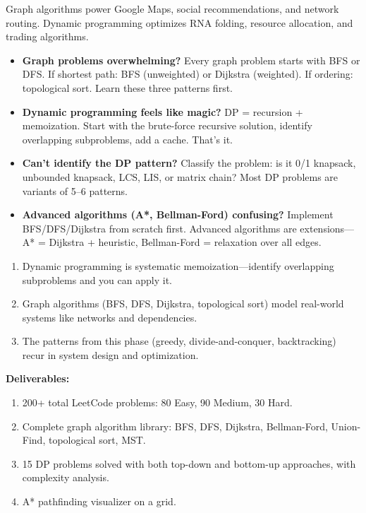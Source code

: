 \documentclass[11pt, a4paper, oneside]{report}
\begin{document}
\begin{realworldbox}
Graph algorithms power Google Maps, social recommendations, and network routing. Dynamic programming optimizes RNA folding, resource allocation, and trading algorithms.
\end{realworldbox}


\begin{stuckbox}
\begin{itemize}[leftmargin=*]
\item \textbf{Graph problems overwhelming?} Every graph problem starts with BFS or DFS. If shortest path: BFS (unweighted) or Dijkstra (weighted). If ordering: topological sort. Learn these three patterns first.
\item \textbf{Dynamic programming feels like magic?} DP = recursion + memoization. Start with the brute-force recursive solution, identify overlapping subproblems, add a cache. That's it.
\item \textbf{Can't identify the DP pattern?} Classify the problem: is it 0/1 knapsack, unbounded knapsack, LCS, LIS, or matrix chain? Most DP problems are variants of 5--6 patterns.
\item \textbf{Advanced algorithms (A*, Bellman-Ford) confusing?} Implement BFS/DFS/Dijkstra from scratch first. Advanced algorithms are extensions---A* = Dijkstra + heuristic, Bellman-Ford = relaxation over all edges.
\end{itemize}
\end{stuckbox}


\begin{takeawaybox}
\begin{enumerate}[leftmargin=*]
\item Dynamic programming is systematic memoization---identify overlapping subproblems and you can apply it.
\item Graph algorithms (BFS, DFS, Dijkstra, topological sort) model real-world systems like networks and dependencies.
\item The patterns from this phase (greedy, divide-and-conquer, backtracking) recur in system design and optimization.
\end{enumerate}
\end{takeawaybox}

\begin{milestonebox}
\textbf{Deliverables:}
\begin{enumerate}[leftmargin=*]
\item 200+ total LeetCode problems: 80 Easy, 90 Medium, 30 Hard.
\item Complete graph algorithm library: BFS, DFS, Dijkstra, Bellman-Ford, Union-Find, topological sort, MST.
\item 15 DP problems solved with both top-down and bottom-up approaches, with complexity analysis.
\item A* pathfinding visualizer on a grid.
\end{enumerate}
\end{milestonebox}
\end{document}
